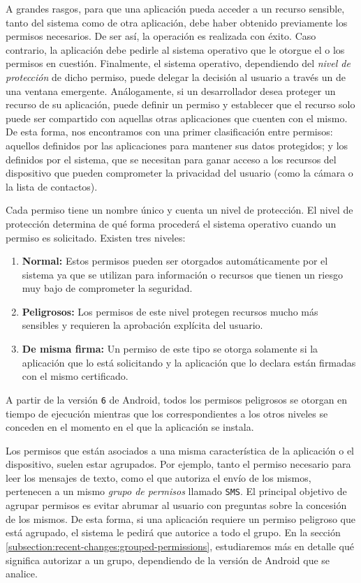 A grandes rasgos, para que una aplicación pueda acceder a un recurso sensible, tanto del sistema como de
otra aplicación, debe haber obtenido previamente los permisos necesarios. De ser así, la operación es
realizada con éxito. Caso contrario, la aplicación debe pedirle al sistema operativo que le otorgue el o
los permisos en cuestión. Finalmente, el sistema operativo, dependiendo del \textit{nivel de protección}
de dicho permiso, puede delegar la decisión al usuario a través un de una ventana emergente.
Análogamente, si un desarrollador desea proteger un recurso de su aplicación, puede definir un permiso y
establecer que el recurso solo puede ser compartido con aquellas otras aplicaciones que cuenten con el
mismo. De esta forma, nos encontramos con una primer clasificación entre permisos: aquellos definidos por
las aplicaciones para mantener sus datos protegidos; y los definidos por el sistema, que se necesitan
para ganar acceso a los recursos del dispositivo que pueden comprometer la privacidad del usuario (como
la cámara o la lista de contactos).

Cada permiso tiene un nombre único y cuenta un nivel de protección. El nivel de protección determina de
qué forma procederá el sistema operativo cuando un permiso es solicitado. Existen tres niveles:

\begin{enumerate}
    \item \textbf{Normal:} Estos permisos pueden ser otorgados automáticamente por el sistema ya que se
          utilizan para información o recursos que tienen un riesgo muy bajo de comprometer la seguridad.
    \item \textbf{Peligrosos:} Los permisos de este nivel protegen recursos mucho más sensibles y
          requieren la aprobación explícita del usuario.
    \item \textbf{De misma firma:} Un permiso de este tipo se otorga solamente si la aplicación que lo
          está solicitando y la aplicación que lo declara están firmadas con el mismo certificado.
\end{enumerate}

A partir de la versión \texttt{6} de Android, todos los permisos peligrosos se otorgan en tiempo de
ejecución mientras que los correspondientes a los otros niveles se conceden en el momento en el que la
aplicación se instala.

Los permisos que están asociados a una misma característica de la aplicación o el dispositivo, suelen
estar agrupados. Por ejemplo, tanto el permiso necesario para leer los mensajes de texto, como el que
autoriza el envío de los mismos, pertenecen a un mismo \textit{grupo de permisos} llamado
\texttt{SMS}. El principal objetivo de agrupar permisos es evitar abrumar al usuario con preguntas sobre
la concesión de los mismos. De esta forma, si una aplicación requiere un permiso peligroso que está
agrupado, el sistema le pedirá que autorice a todo el grupo. En la sección
\ref{subsection:recent-changes:grouped-permissions}, estudiaremos más en detalle qué significa autorizar
a un grupo, dependiendo de la versión de Android que se analice.

